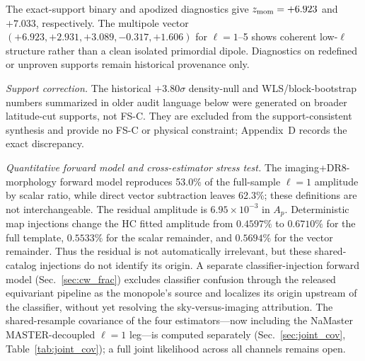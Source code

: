 \documentclass[twocolumn,linenumbers]{aastex702}
\newcommand{\FSC}{\textsc{FS-C}}
\begin{document}
The exact-support binary and apodized diagnostics give $z_{\rm mom}=+6.923$ and $+7.033$, respectively. The multipole vector $(+6.923,+2.931,+3.089,-0.317,+1.606)$ for $\ell=1$--5 shows coherent low-$\ell$ structure rather than a clean isolated primordial dipole. Diagnostics on redefined or unproven supports remain historical provenance only.

\emph{Support correction.} The historical $+3.80\sigma$ density-null and WLS/block-bootstrap numbers summarized in older audit language below were generated on broader latitude-cut supports, not \FSC{}. They are excluded from the support-consistent synthesis and provide no \FSC{} or physical constraint; Appendix~D records the exact discrepancy.

\emph{Quantitative forward model and cross-estimator stress test.} The imaging+DR8-morphology forward model reproduces 53.0\% of the full-sample $\ell=1$ amplitude by scalar ratio, while direct vector subtraction leaves 62.3\%; these definitions are not interchangeable. The residual amplitude is $6.95\times10^{-3}$ in $A_p$. Deterministic map injections change the HC fitted amplitude from $0.4597\%$ to $0.6710\%$ for the full template, $0.5533\%$ for the scalar remainder, and $0.5694\%$ for the vector remainder. Thus the residual is not automatically irrelevant, but these shared-catalog injections do not identify its origin. A separate classifier-injection forward model (Sec.~\ref{sec:cw_frac}) excludes classifier confusion through the released equivariant pipeline as the monopole's source and localizes its origin upstream of the classifier, without yet resolving the sky-versus-imaging attribution. The shared-resample covariance of the four estimators---now including the NaMaster MASTER-decoupled $\ell=1$ leg---is computed separately (Sec.~\ref{sec:joint_cov}, Table~\ref{tab:joint_cov}); a full joint likelihood across all channels remains open.
\end{document}
